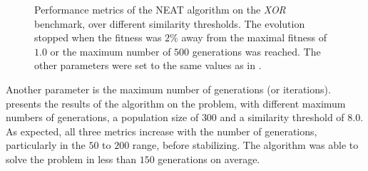 \begin{figure}
\begin{center}
    \end{center}
    \caption{Performance metrics of the NEAT algorithm on the \textit{XOR} benchmark, over different similarity thresholds.
    The evolution stopped when the fitness was $2\%$ away from the maximal fitness of $1.0$ or the maximum number of $500$ generations was reached.
    The other parameters were set to the same values as in \cite{neat}.}
    \label{fig:neat_xor_similarity}
\end{figure}

Another parameter is the maximum number of generations (or iterations). presents the results of the algorithm on the problem, with different maximum numbers of generations,
a population size of $300$ and a similarity threshold of $8.0$. As expected, all three metrics increase with the number of generations, particularly in the $50$ to $200$ range, before stabilizing.
The algorithm was able to solve the problem in less than $150$ generations on average.

